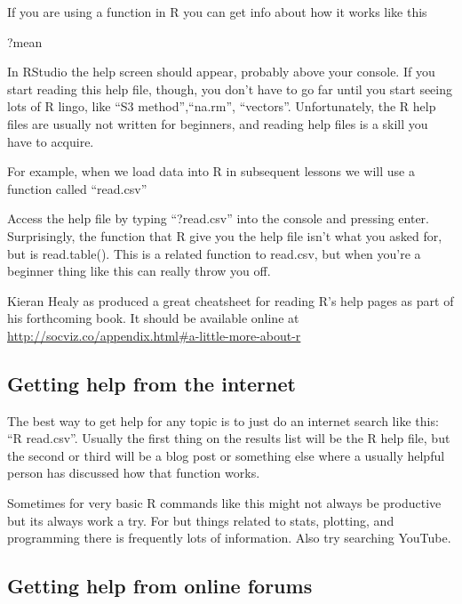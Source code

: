 \documentclass[
]{book}
\newenvironment{Shaded}{\begin{snugshade}}{\end{snugshade}}
\newcommand{\NormalTok}[1]{#1}
\begin{document}
If you are using a function in R you can get info about how it works like this

\begin{Shaded}
\begin{Highlighting}[]
\NormalTok{?mean}
\end{Highlighting}
\end{Shaded}

In RStudio the help screen should appear, probably above your console. If you start reading this help file, though, you don't have to go far until you start seeing lots of R lingo, like ``S3 method'',``na.rm'', ``vectors''. Unfortunately, the R help files are usually not written for beginners, and reading help files is a skill you have to acquire.

For example, when we load data into R in subsequent lessons we will use a function called ``read.csv''

Access the help file by typing ``?read.csv'' into the console and pressing enter. Surprisingly, the function that R give you the help file isn't what you asked for, but is read.table(). This is a related function to read.csv, but when you're a beginner thing like this can really throw you off.

Kieran Healy as produced a great cheatsheet for reading R's help pages as part of his forthcoming book. It should be available online at \url{http://socviz.co/appendix.html\#a-little-more-about-r}

\hypertarget{getting-help-from-the-internet}{%
\subsection{Getting help from the internet}\label{getting-help-from-the-internet}}

The best way to get help for any topic is to just do an internet search like this: ``R read.csv''. Usually the first thing on the results list will be the R help file, but the second or third will be a blog post or something else where a usually helpful person has discussed how that function works.

Sometimes for very basic R commands like this might not always be productive but its always work a try. For but things related to stats, plotting, and programming there is frequently lots of information. Also try searching YouTube.

\hypertarget{getting-help-from-online-forums}{%
\subsection{Getting help from online forums}\label{getting-help-from-online-forums}}
\end{document}

